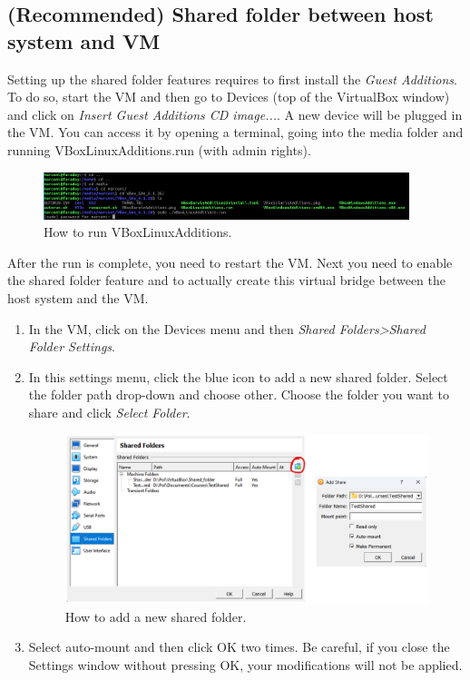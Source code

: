 \subsection{(Recommended) Shared folder between host system and VM}

Setting up the shared folder features requires to first install the \textit{Guest Additions}. To do so, start the VM and then go to Devices (top of the VirtualBox window) and click on \textit{Insert Guest Additions CD image...}. A new device will be plugged in the VM. You can access it by opening a terminal, going into the media folder and running VBoxLinuxAdditions.run (with admin rights).
\begin{figure}[H]
    \centering
    \includegraphics[width=0.95\textwidth]{figures/run_VBOX.PNG}
	\caption{How to run VBoxLinuxAdditions.}
	\label{figrun}
\end{figure}
After the run is complete, you need to restart the VM. Next you need to enable the shared folder feature and to actually create this virtual bridge between the host system and the VM.

\begin{enumerate}
    \item In the VM, click on the Devices menu and then \textit{Shared Folders>Shared Folder Settings}.
    \item In this settings menu, click the blue icon to add a new shared folder. Select the folder path drop-down and choose other. Choose the folder you want to share and click \textit{Select Folder}.
    \begin{figure}[H]
    \centering
    \includegraphics[width = \textwidth]{figures/settings_shared_folder_full.png}
	\caption{How to add a new shared folder.}
	\label{figrun}
    \end{figure}
    \item Select auto-mount and then click OK two times. Be careful, if you close the Settings window without pressing OK, your modifications will not be applied.
\end{enumerate}




